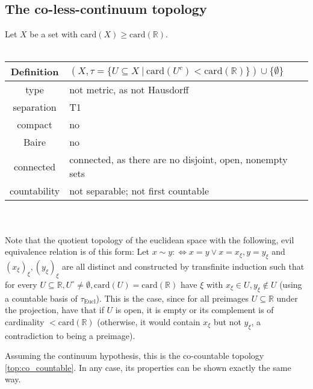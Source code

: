 \documentclass{scrartcl}
\newcommand{\R}{\mathbb{R}}
\begin{document}
\subsection{The co-less-continuum topology}
Let $X$ be a set with $\mathrm{card}(X) \geq \mathrm{card}(\R)$.
\\\\
\begin{tabular}{c | p{}}
    Definition & $(X, \tau = \{U \subseteq X \ | \ \mathrm{card}(U^c) < \mathrm{card}(\R)\}) \cup \{\emptyset\}$ \\
    \hline
    type & not metric, as not Hausdorff \\
    separation & T1 \\
    compact & no \\
    Baire & no \\
    connected & connected, as there are no disjoint, open, nonempty sets \\
    countability & not separable; not first countable
\end{tabular}
\\\\
Note that the quotient topology of the euclidean space with the following, evil equivalence relation is of this form:
Let $x \sim y :\Leftrightarrow x = y \vee x = x_\xi, y = y_\xi$ and $(x_\xi)_\xi, (y_\xi)_\xi$ are all distinct and constructed by transfinite induction such that for every $U \subseteq \R, U^\circ \neq \emptyset, \mathrm{card}(U) = \mathrm{card}(\R)$ have $\xi$ with $x_\xi \in U, y_\xi \notin U$ (using a countable basis of $\tau_{\mathrm{Eucl}}$).
This is the case, since for all preimages $U \subseteq \R$ under the projection, have that if $U$ is open, it is empty or its complement is of cardinality $< \mathrm{card}(\R)$ (otherwise, it would contain $x_\xi$ but not $y_\xi$, a contradiction to being a preimage).

Assuming the continuum hypothesis, this is the co-countable topology \ref{top:co_countable}. In any case, its properties can be shown exactly the same way.
\end{document}
